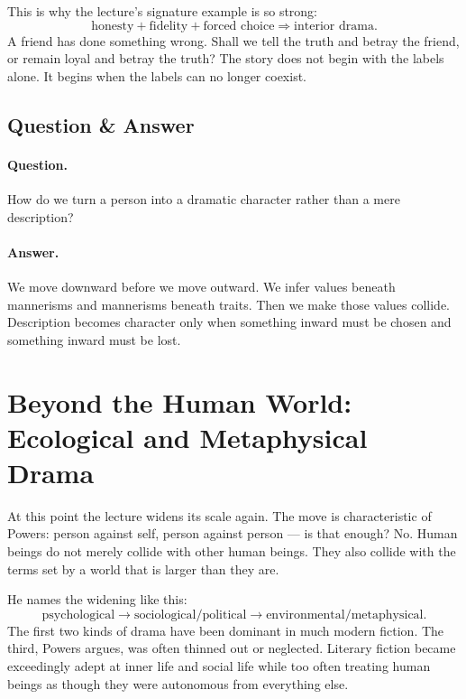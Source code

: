 This is why the lecture's signature example is so strong:
\begin{equation}
\text{honesty} + \text{fidelity} + \text{forced choice} \Rightarrow \text{interior drama}.
\end{equation}
A friend has done something wrong. Shall we tell the truth and betray the friend, or remain loyal and betray the truth? The story does not begin with the labels alone. It begins when the labels can no longer coexist.

\subsection{Question \& Answer}

\paragraph{Question.} How do we turn a person into a dramatic character rather than a mere description?

\paragraph{Answer.} We move downward before we move outward. We infer values beneath mannerisms and mannerisms beneath traits. Then we make those values collide. Description becomes character only when something inward must be chosen and something inward must be lost.

\section{Beyond the Human World: Ecological and Metaphysical Drama}

At this point the lecture widens its scale again. The move is characteristic of Powers: person against self, person against person --- is that enough? No. Human beings do not merely collide with other human beings. They also collide with the terms set by a world that is larger than they are.

He names the widening like this:
\begin{equation}
\text{psychological} \to \text{sociological/political} \to \text{environmental/metaphysical}.
\end{equation}
The first two kinds of drama have been dominant in much modern fiction. The third, Powers argues, was often thinned out or neglected. Literary fiction became exceedingly adept at inner life and social life while too often treating human beings as though they were autonomous from everything else.

